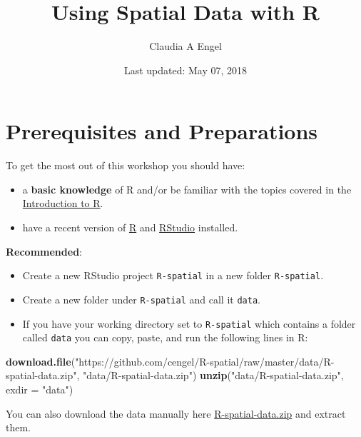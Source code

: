 \documentclass[]{book}
\title{Using Spatial Data with R}
\author{Claudia A Engel}
\date{Last updated: May 07, 2018}
\newenvironment{Shaded}{\begin{snugshade}}{\end{snugshade}}
\newcommand{\KeywordTok}[1]{\textcolor[rgb]{0.13,0.29,0.53}{\textbf{#1}}}
\newcommand{\DataTypeTok}[1]{\textcolor[rgb]{0.13,0.29,0.53}{#1}}
\newcommand{\StringTok}[1]{\textcolor[rgb]{0.31,0.60,0.02}{#1}}
\newcommand{\NormalTok}[1]{#1}
\providecommand{\tightlist}{%
  \setlength{\itemsep}{0pt}\setlength{\parskip}{0pt}}
\theoremstyle{definition}
\theoremstyle{definition}
\theoremstyle{definition}
\theoremstyle{remark}
\begin{document}
\maketitle

{
\setcounter{tocdepth}{1}
\tableofcontents
}
\chapter*{Prerequisites and
Preparations}\label{prerequisites-and-preparations}

To get the most out of this workshop you should have:

\begin{itemize}
\tightlist
\item
  a \textbf{basic knowledge} of R and/or be familiar with the topics
  covered in the \href{https://cengel.github.io/R-intro/}{Introduction
  to R}.
\item
  have a recent version of \href{https://cran.r-project.org/}{R} and
  \href{https://www.rstudio.com/}{RStudio} installed.
\end{itemize}

\textbf{Recommended}:

\begin{itemize}
\item
  Create a new RStudio project \texttt{R-spatial} in a new folder
  \texttt{R-spatial}.
\item
  Create a new folder under \texttt{R-spatial} and call it
  \texttt{data}.
\item
  If you have your working directory set to \texttt{R-spatial} which
  contains a folder called \texttt{data} you can copy, paste, and run
  the following lines in R:
\end{itemize}

\begin{Shaded}
\begin{Highlighting}[]
\KeywordTok{download.file}\NormalTok{(}\StringTok{"https://github.com/cengel/R-spatial/raw/master/data/R-spatial-data.zip"}\NormalTok{, }\StringTok{"data/R-spatial-data.zip"}\NormalTok{)}
\KeywordTok{unzip}\NormalTok{(}\StringTok{"data/R-spatial-data.zip"}\NormalTok{, }\DataTypeTok{exdir =} \StringTok{"data"}\NormalTok{)}
\end{Highlighting}
\end{Shaded}

You can also download the data manually here
\href{https://github.com/cengel/R-spatial/raw/master/data/R-spatial-data.zip}{R-spatial-data.zip}
and extract them.
\end{document}
